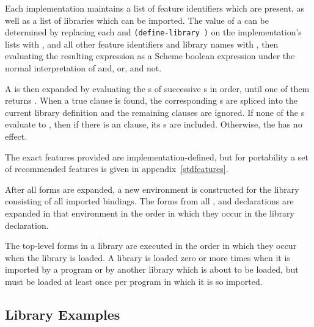 Each implementation maintains a list of feature identifiers which are
present, as well as a list of libraries which can be imported.  The
value of a  can be determined by replacing
each  and {\tt(define-library )}
on the implementation's lists with \schtrue, and all other feature
identifiers and library names with \schfalse, then evaluating the
resulting expression as a Scheme boolean expression under the normal
interpretation of {\cf and}, {\cf or}, and {\cf not}.

A  is then expanded by evaluating the
s of successive s
in order, until one of them returns \schtrue.  When a true clause is
found, the corresponding s are spliced into
the current library definition and the remaining clauses are ignored.
If none of the s evaluate to \schtrue, then
if there is an  clause, its s are
included.  Otherwise, the  has no effect.

The exact features provided are implementation-defined, but for
portability a set of recommended features is given in
appendix~\ref{stdfeatures}.


After all  forms are expanded, a new environment is
constructed for the library consisting of all imported bindings.  The
forms from all ,  and 
declarations are expanded in that environment in the order in which
they occur in the library declaration.

The top-level forms in a library are executed in the order in which
they occur when the library is loaded.  A library is loaded zero or more
times when it is imported by a program or by another library which is
about to be loaded, but must be loaded at least once per program in
which it is so imported.


\subsection{Library Examples}


